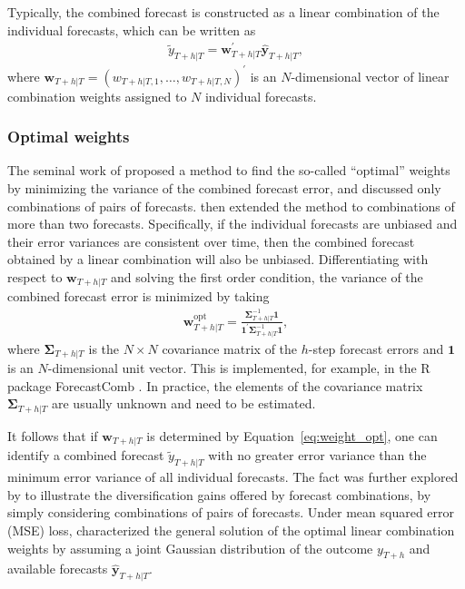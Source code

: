 \documentclass[a4paper,11pt]{article}
\newcommand{\pkg}[1]{{\normalfont\fontseries{b}\selectfont #1}}
\let\proglang=\textsf
\begin{document}
Typically, the combined forecast is constructed as a linear combination of the individual forecasts, which can be written as
\begin{align*}
  \tilde{y}_{T+h|T}=\bm{w}_{T+h|T}^{\prime} \hat{\bm{y}}_{T+h|T},
\end{align*}
where $\bm{w}_{T+h|T}=\left(w_{T+h|T, 1}, \dots, w_{T+h|T, N}\right)^{\prime}$ is an $N$-dimensional vector of linear combination weights assigned to $N$ individual forecasts.

\subsubsection*{Optimal weights}

The seminal work of \citet{Bates1969-yj} proposed a method to find the so-called ``optimal'' weights by minimizing the variance of the combined forecast error, and discussed only combinations of pairs of forecasts. \citet{Newbold1974-lp} then extended the method to combinations of more than two forecasts. Specifically, if the individual forecasts are unbiased and their error variances are consistent over time, then the combined forecast obtained by a linear combination will also be unbiased. Differentiating with respect to $\bm{w}_{T+h|T}$ and solving the first order condition, the variance of the combined forecast error is minimized by taking
\begin{align}
  \label{eq:weight_opt}
  \bm{w}_{T+h|T}^{\text{opt}}=\frac{\bm{\Sigma}_{T+h|T}^{-1}\bm{1}}{\bm{1}^{\prime} \bm{\Sigma}_{T+h|T}^{-1} \bm{1}},
\end{align}
where $\bm{\Sigma}_{T+h|T}$ is the $N \times N$ covariance matrix of the $h$-step forecast errors and $\bm{1}$ is an $N$-dimensional unit vector. This is implemented, for example, in the \proglang{R} package \pkg{ForecastComb} \citep{rForecastComb}. In practice, the elements of the covariance matrix $\bm{\Sigma}_{T+h|T}$ are usually unknown and need to be estimated.

It follows that if $\bm{w}_{T+h|T}$ is determined by Equation~\eqref{eq:weight_opt}, one can identify a combined forecast $\tilde{y}_{T+h|T}$ with no greater error variance than the minimum error variance of all individual forecasts. The fact was further explored by \citet{Timmermann2006-en} to illustrate the diversification gains offered by forecast combinations, by simply considering combinations of pairs of forecasts. Under mean squared error (MSE) loss, \citet{Timmermann2006-en} characterized the general solution of the optimal linear combination weights by assuming a joint Gaussian distribution of the outcome $y_{T+h}$ and available forecasts $\hat{\bm{y}}_{T+h|T}$.
\end{document}
